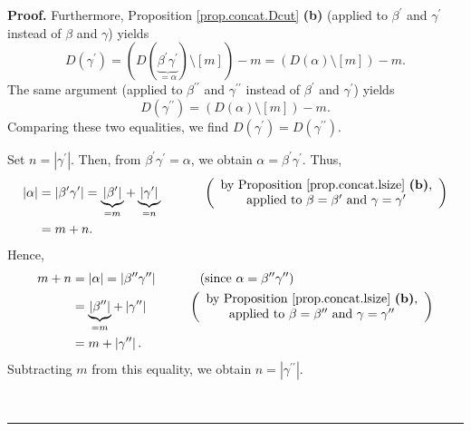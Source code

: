 \documentclass[numbers=enddot,12pt,final,onecolumn,notitlepage]{scrartcl}%
\theoremstyle{definition}
\newenvironment{proof}[1][Proof]{\noindent\textbf{#1.} }{\ \rule{0.5em}{0.5em}}
\begin{document}
\begin{proof}
Furthermore, Proposition \ref{prop.concat.Dcut} \textbf{(b)} (applied to
$\beta^{\prime}$ and $\gamma^{\prime}$ instead of $\beta$ and $\gamma$)
yields
\[
D\left(  \gamma^{\prime}\right)  =\left(  D\left(  \underbrace{\beta^{\prime
}\gamma^{\prime}}_{=\alpha}\right)  \setminus\left[  m\right]  \right)
-m=\left(  D\left(  \alpha\right)  \setminus\left[  m\right]  \right)  -m.
\]
The same argument (applied to $\beta^{\prime\prime}$ and $\gamma^{\prime
\prime}$ instead of $\beta^{\prime}$ and $\gamma^{\prime}$) yields
\[
D\left(  \gamma^{\prime\prime}\right)  =\left(  D\left(  \alpha\right)
\setminus\left[  m\right]  \right)  -m.
\]
Comparing these two equalities, we find $D\left(  \gamma^{\prime}\right)
=D\left(  \gamma^{\prime\prime}\right)  $.

Set $n=\left\vert \gamma^{\prime}\right\vert $. Then, from $\beta^{\prime
}\gamma^{\prime}=\alpha$, we obtain $\alpha=\beta^{\prime}\gamma^{\prime}$.
Thus,
\begin{align*}
\left\vert \alpha\right\vert  &  =\left\vert \beta^{\prime}\gamma^{\prime
}\right\vert =\underbrace{\left\vert \beta^{\prime}\right\vert }%
_{=m}+\underbrace{\left\vert \gamma^{\prime}\right\vert }_{=n}%
\ \ \ \ \ \ \ \ \ \ \left(
\begin{array}
[c]{c}%
\text{by Proposition \ref{prop.concat.lsize} \textbf{(b)},}\\
\text{applied to }\beta=\beta^{\prime}\text{ and }\gamma=\gamma^{\prime}%
\end{array}
\right) \\
&  =m+n.
\end{align*}
Hence,%
\begin{align*}
m+n  &  =\left\vert \alpha\right\vert =\left\vert \beta^{\prime\prime}%
\gamma^{\prime\prime}\right\vert \ \ \ \ \ \ \ \ \ \ \left(  \text{since
}\alpha=\beta^{\prime\prime}\gamma^{\prime\prime}\right) \\
&  =\underbrace{\left\vert \beta^{\prime\prime}\right\vert }_{=m}+\left\vert
\gamma^{\prime\prime}\right\vert \ \ \ \ \ \ \ \ \ \ \left(
\begin{array}
[c]{c}%
\text{by Proposition \ref{prop.concat.lsize} \textbf{(b)},}\\
\text{applied to }\beta=\beta^{\prime\prime}\text{ and }\gamma=\gamma
^{\prime\prime}%
\end{array}
\right) \\
&  =m+\left\vert \gamma^{\prime\prime}\right\vert .
\end{align*}
Subtracting $m$ from this equality, we obtain $n=\left\vert \gamma
^{\prime\prime}\right\vert $.


\end{proof}
\end{document}
